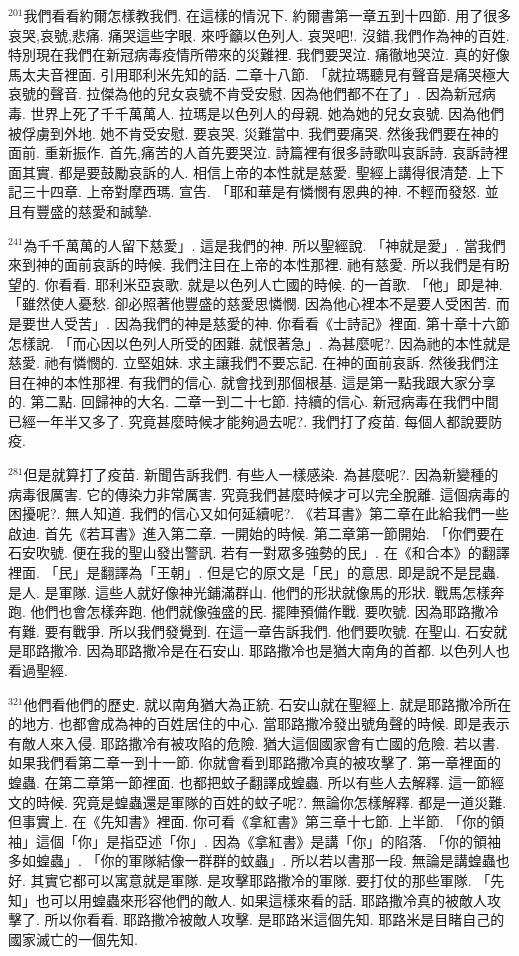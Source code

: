\documentclass{book}
\begin{document}
$^{201}$我們看看約爾怎樣教我們.
在這樣的情況下.
約爾書第一章五到十四節.
用了很多哀哭,哀號,悲痛.
痛哭這些字眼.
來呼籲以色列人.
哀哭吧!.
沒錯,我們作為神的百姓.
特別現在我們在新冠病毒疫情所帶來的災難裡.
我們要哭泣.
痛徹地哭泣.
真的好像馬太夫音裡面.
引用耶利米先知的話.
二章十八節.
「就拉瑪聽見有聲音是痛哭極大哀號的聲音.
拉傑為他的兒女哀號不肯受安慰.
因為他們都不在了」.
因為新冠病毒.
世界上死了千千萬萬人.
拉瑪是以色列人的母親.
她為她的兒女哀號.
因為他們被俘虜到外地.
她不肯受安慰.
要哀哭.
災難當中.
我們要痛哭.
然後我們要在神的面前.
重新振作.
首先,痛苦的人首先要哭泣.
詩篇裡有很多詩歌叫哀訴詩.
哀訴詩裡面其實.
都是要鼓勵哀訴的人.
相信上帝的本性就是慈愛.
聖經上講得很清楚.
上下記三十四章.
上帝對摩西瑪.
宣告.
「耶和華是有憐憫有恩典的神.
不輕而發怒.
並且有豐盛的慈愛和誠摯.

$^{241}$為千千萬萬的人留下慈愛」.
這是我們的神.
所以聖經說.
「神就是愛」.
當我們來到神的面前哀訴的時候.
我們注目在上帝的本性那裡.
祂有慈愛.
所以我們是有盼望的.
你看看.
耶利米亞哀歌.
就是以色列人亡國的時候.
的一首歌.
「他」即是神.
「雖然使人憂愁.
卻必照著他豐盛的慈愛思憐憫.
因為他心裡本不是要人受困苦.
而是要世人受苦」.
因為我們的神是慈愛的神.
你看看《士詩記》裡面.
第十章十六節怎樣說.
「而心因以色列人所受的困難.
就恨著急」.
為甚麼呢?.
因為祂的本性就是慈愛.
祂有憐憫的.
立堅姐妹.
求主讓我們不要忘記.
在神的面前哀訴.
然後我們注目在神的本性那裡.
有我們的信心.
就會找到那個根基.
這是第一點我跟大家分享的.
第二點.
回歸神的大名.
二章一到二十七節.
持續的信心.
新冠病毒在我們中間已經一年半又多了.
究竟甚麼時候才能夠過去呢?.
我們打了疫苗.
每個人都說要防疫.

$^{281}$但是就算打了疫苗.
新聞告訴我們.
有些人一樣感染.
為甚麼呢?.
因為新變種的病毒很厲害.
它的傳染力非常厲害.
究竟我們甚麼時候才可以完全脫離.
這個病毒的困擾呢?.
無人知道.
我們的信心又如何延續呢?.
《若耳書》第二章在此給我們一些啟迪.
首先《若耳書》進入第二章.
一開始的時候.
第二章第一節開始.
「你們要在石安吹號.
便在我的聖山發出警訊.
若有一對眾多強勢的民」.
在《和合本》的翻譯裡面.
「民」是翻譯為「王朝」.
但是它的原文是「民」的意思.
即是說不是昆蟲.
是人.
是軍隊.
這些人就好像神光鋪滿群山.
他們的形狀就像馬的形狀.
戰馬怎樣奔跑.
他們也會怎樣奔跑.
他們就像強盛的民.
擺陣預備作戰.
要吹號.
因為耶路撒冷有難.
要有戰爭.
所以我們發覺到.
在這一章告訴我們.
他們要吹號.
在聖山.
石安就是耶路撒冷.
因為耶路撒冷是在石安山.
耶路撒冷也是猶大南角的首都.
以色列人也看過聖經.

$^{321}$他們看他們的歷史.
就以南角猶大為正統.
石安山就在聖經上.
就是耶路撒冷所在的地方.
也都會成為神的百姓居住的中心.
當耶路撒冷發出號角聲的時候.
即是表示有敵人來入侵.
耶路撒冷有被攻陷的危險.
猶大這個國家會有亡國的危險.
若以書.
如果我們看第二章一到十一節.
你就會看到耶路撒冷真的被攻擊了.
第一章裡面的蝗蟲.
在第二章第一節裡面.
也都把蚊子翻譯成蝗蟲.
所以有些人去解釋.
這一節經文的時候.
究竟是蝗蟲還是軍隊的百姓的蚊子呢?.
無論你怎樣解釋.
都是一道災難.
但事實上.
在《先知書》裡面.
你可看《拿紅書》第三章十七節.
上半節.
「你的領袖」這個「你」是指亞述「你」.
因為《拿紅書》是講「你」的陷落.
「你的領袖多如蝗蟲」.
「你的軍隊結像一群群的蚊蟲」.
所以若以書那一段.
無論是講蝗蟲也好.
其實它都可以寓意就是軍隊.
是攻擊耶路撒冷的軍隊.
要打仗的那些軍隊.
「先知」也可以用蝗蟲來形容他們的敵人.
如果這樣來看的話.
耶路撒冷真的被敵人攻擊了.
所以你看看.
耶路撒冷被敵人攻擊.
是耶路米這個先知.
耶路米是目睹自己的國家滅亡的一個先知.
\end{document}
